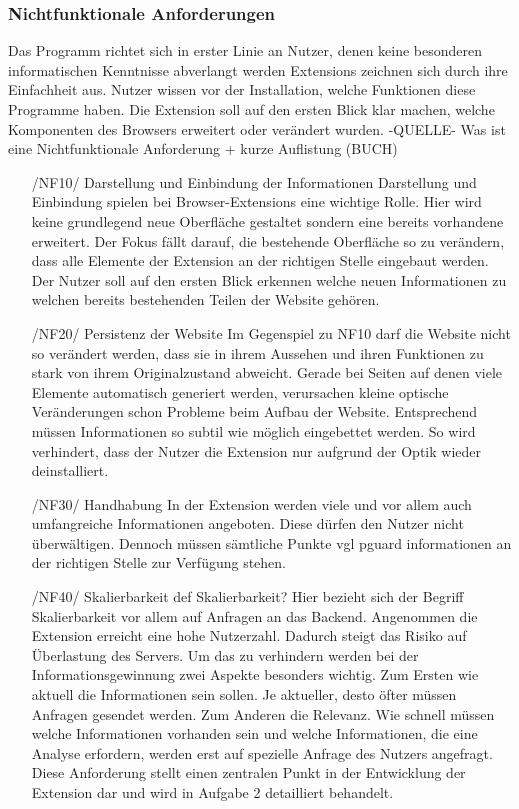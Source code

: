 \subsubsection{Nichtfunktionale Anforderungen}
Das Programm richtet sich in erster Linie an Nutzer, denen keine besonderen informatischen Kenntnisse abverlangt werden
Extensions zeichnen sich durch ihre Einfachheit aus. Nutzer wissen vor der Installation, welche Funktionen diese Programme haben. Die Extension soll auf den ersten Blick klar machen, welche Komponenten des Browsers erweitert oder verändert wurden.
-QUELLE- Was ist eine Nichtfunktionale Anforderung + kurze Auflistung (BUCH)
\begin{itemize}
	\item[/NF10/] Darstellung und Einbindung der Informationen
	Darstellung und Einbindung spielen bei Browser-Extensions eine wichtige Rolle. Hier wird keine grundlegend neue Oberfläche gestaltet sondern eine bereits vorhandene erweitert. Der Fokus fällt darauf, die bestehende Oberfläche so zu verändern, dass alle Elemente der Extension an der richtigen Stelle eingebaut werden. Der Nutzer soll auf den ersten Blick erkennen welche neuen Informationen zu welchen bereits bestehenden Teilen der Website gehören.
	\item[/NF20/] Persistenz der Website
	Im Gegenspiel zu NF10 darf die Website nicht so verändert werden, dass sie in ihrem Aussehen und ihren Funktionen zu stark von ihrem Originalzustand abweicht. Gerade bei Seiten auf denen viele Elemente automatisch generiert werden, verursachen kleine optische Veränderungen schon Probleme beim Aufbau der Website. Entsprechend müssen Informationen so subtil wie möglich eingebettet werden. So wird verhindert, dass der Nutzer die Extension nur aufgrund der Optik wieder deinstalliert.
	\item[/NF30/] Handhabung
	In der Extension werden viele und vor allem auch umfangreiche Informationen angeboten. Diese dürfen den Nutzer nicht überwältigen. Dennoch müssen sämtliche Punkte vgl pguard informationen an der richtigen Stelle zur Verfügung stehen.
	\item[/NF40/] Skalierbarkeit
	def Skalierbarkeit? Hier bezieht sich der Begriff Skalierbarkeit vor allem auf Anfragen an das Backend. Angenommen die Extension erreicht eine hohe Nutzerzahl. Dadurch steigt das Risiko auf Überlastung des Servers. Um das zu verhindern werden bei der Informationsgewinnung zwei Aspekte besonders wichtig. Zum Ersten wie aktuell die Informationen sein sollen. Je aktueller, desto öfter müssen Anfragen gesendet werden. Zum Anderen die Relevanz. Wie schnell müssen welche Informationen vorhanden sein und welche Informationen, die eine Analyse erfordern, werden erst auf spezielle Anfrage des Nutzers angefragt. Diese Anforderung stellt einen zentralen Punkt in der Entwicklung der Extension dar und wird in Aufgabe 2 detailliert behandelt.

\end{itemize}
